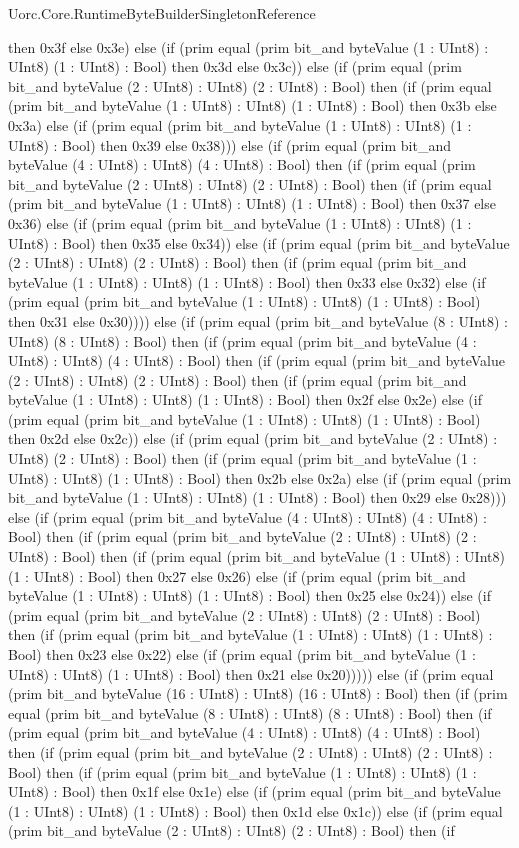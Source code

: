 \begin{lexlean}{Uorc.Core.RuntimeByteBuilderSingletonReference}
\begin{semanticmodule}
{then 0x3f else 0x3e) else (if (prim equal (prim bit_and byteValue (1 : UInt8) : UInt8) (1 : UInt8) : Bool) then 0x3d else 0x3c)) else (if (prim equal (prim bit_and byteValue (2 : UInt8) : UInt8) (2 : UInt8) : Bool) then (if (prim equal (prim bit_and byteValue (1 : UInt8) : UInt8) (1 : UInt8) : Bool) then 0x3b else 0x3a) else (if (prim equal (prim bit_and byteValue (1 : UInt8) : UInt8) (1 : UInt8) : Bool) then 0x39 else 0x38))) else (if (prim equal (prim bit_and byteValue (4 : UInt8) : UInt8) (4 : UInt8) : Bool) then (if (prim equal (prim bit_and byteValue (2 : UInt8) : UInt8) (2 : UInt8) : Bool) then (if (prim equal (prim bit_and byteValue (1 : UInt8) : UInt8) (1 : UInt8) : Bool) then 0x37 else 0x36) else (if (prim equal (prim bit_and byteValue (1 : UInt8) : UInt8) (1 : UInt8) : Bool) then 0x35 else 0x34)) else (if (prim equal (prim bit_and byteValue (2 : UInt8) : UInt8) (2 : UInt8) : Bool) then (if (prim equal (prim bit_and byteValue (1 : UInt8) : UInt8) (1 : UInt8) : Bool) then 0x33 else 0x32) else (if (prim equal (prim bit_and byteValue (1 : UInt8) : UInt8) (1 : UInt8) : Bool) then 0x31 else 0x30)))) else (if (prim equal (prim bit_and byteValue (8 : UInt8) : UInt8) (8 : UInt8) : Bool) then (if (prim equal (prim bit_and byteValue (4 : UInt8) : UInt8) (4 : UInt8) : Bool) then (if (prim equal (prim bit_and byteValue (2 : UInt8) : UInt8) (2 : UInt8) : Bool) then (if (prim equal (prim bit_and byteValue (1 : UInt8) : UInt8) (1 : UInt8) : Bool) then 0x2f else 0x2e) else (if (prim equal (prim bit_and byteValue (1 : UInt8) : UInt8) (1 : UInt8) : Bool) then 0x2d else 0x2c)) else (if (prim equal (prim bit_and byteValue (2 : UInt8) : UInt8) (2 : UInt8) : Bool) then (if (prim equal (prim bit_and byteValue (1 : UInt8) : UInt8) (1 : UInt8) : Bool) then 0x2b else 0x2a) else (if (prim equal (prim bit_and byteValue (1 : UInt8) : UInt8) (1 : UInt8) : Bool) then 0x29 else 0x28))) else (if (prim equal (prim bit_and byteValue (4 : UInt8) : UInt8) (4 : UInt8) : Bool) then (if (prim equal (prim bit_and byteValue (2 : UInt8) : UInt8) (2 : UInt8) : Bool) then (if (prim equal (prim bit_and byteValue (1 : UInt8) : UInt8) (1 : UInt8) : Bool) then 0x27 else 0x26) else (if (prim equal (prim bit_and byteValue (1 : UInt8) : UInt8) (1 : UInt8) : Bool) then 0x25 else 0x24)) else (if (prim equal (prim bit_and byteValue (2 : UInt8) : UInt8) (2 : UInt8) : Bool) then (if (prim equal (prim bit_and byteValue (1 : UInt8) : UInt8) (1 : UInt8) : Bool) then 0x23 else 0x22) else (if (prim equal (prim bit_and byteValue (1 : UInt8) : UInt8) (1 : UInt8) : Bool) then 0x21 else 0x20))))) else (if (prim equal (prim bit_and byteValue (16 : UInt8) : UInt8) (16 : UInt8) : Bool) then (if (prim equal (prim bit_and byteValue (8 : UInt8) : UInt8) (8 : UInt8) : Bool) then (if (prim equal (prim bit_and byteValue (4 : UInt8) : UInt8) (4 : UInt8) : Bool) then (if (prim equal (prim bit_and byteValue (2 : UInt8) : UInt8) (2 : UInt8) : Bool) then (if (prim equal (prim bit_and byteValue (1 : UInt8) : UInt8) (1 : UInt8) : Bool) then 0x1f else 0x1e) else (if (prim equal (prim bit_and byteValue (1 : UInt8) : UInt8) (1 : UInt8) : Bool) then 0x1d else 0x1c)) else (if (prim equal (prim bit_and byteValue (2 : UInt8) : UInt8) (2 : UInt8) : Bool) then (if }
\end{semanticmodule}
\end{lexlean}

